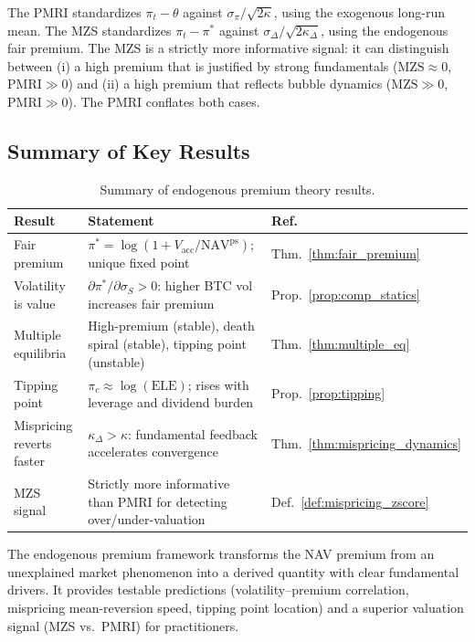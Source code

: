 \begin{remark}
The PMRI standardizes $\pi_t - \theta$ against $\sigma_\pi/\sqrt{2\kappa}$,
using the exogenous long-run mean.  The MZS standardizes $\pi_t - \pi^*$
against $\sigma_\Delta/\sqrt{2\kappa_\Delta}$, using the endogenous fair
premium.  The MZS is a strictly more informative signal: it can distinguish
between (i) a high premium that is justified by strong fundamentals
($\mathrm{MZS} \approx 0$, $\mathrm{PMRI} \gg 0$) and (ii) a high premium
that reflects bubble dynamics ($\mathrm{MZS} \gg 0$, $\mathrm{PMRI} \gg 0$).
The PMRI conflates both cases.
\end{remark}

\subsection{Summary of Key Results}\label{subsec:endo_summary}

\begin{table}[htbp]
\centering
\caption{Summary of endogenous premium theory results.}
\label{tab:endo_summary}
\small
\begin{tabular}{@{}lp{8cm}l@{}}
\toprule
\textbf{Result} & \textbf{Statement} & \textbf{Ref.} \\
\midrule
Fair premium & $\pi^* = \log(1 + V_{\mathrm{acc}} / \mathrm{NAV}^{\mathrm{ps}})$;
  unique fixed point & Thm.~\ref{thm:fair_premium} \\
Volatility is value & $\partial\pi^*/\partial\sigma_S > 0$: higher BTC vol
  increases fair premium & Prop.~\ref{prop:comp_statics} \\
Multiple equilibria & High-premium (stable), death spiral (stable),
  tipping point (unstable) & Thm.~\ref{thm:multiple_eq} \\
Tipping point & $\pi_c \approx \log(\mathrm{ELE})$; rises with leverage
  and dividend burden & Prop.~\ref{prop:tipping} \\
Mispricing reverts faster & $\kappa_\Delta > \kappa$: fundamental feedback
  accelerates convergence & Thm.~\ref{thm:mispricing_dynamics} \\
MZS signal & Strictly more informative than PMRI for detecting over/under-valuation
  & Def.~\ref{def:mispricing_zscore} \\
\bottomrule
\end{tabular}
\end{table}

\noindent The endogenous premium framework transforms the NAV premium from
an unexplained market phenomenon into a derived quantity with clear
fundamental drivers.  It provides testable predictions (volatility--premium
correlation, mispricing mean-reversion speed, tipping point location) and
a superior valuation signal (MZS vs.\ PMRI) for practitioners.
